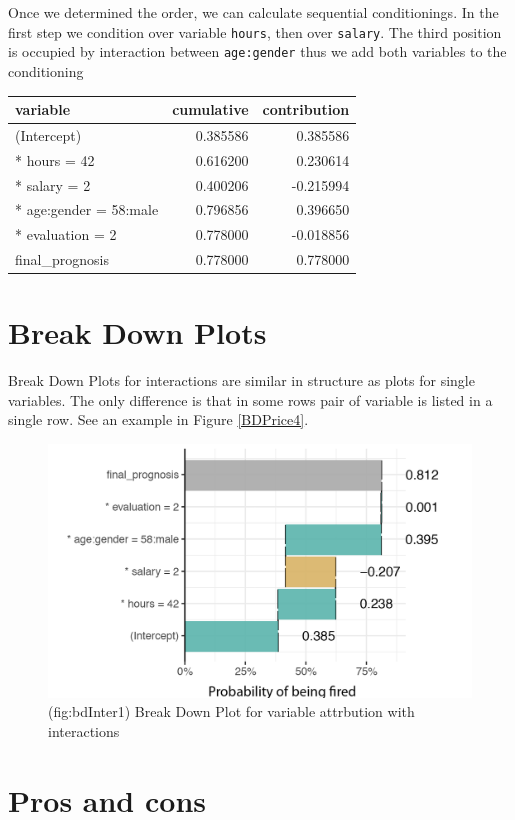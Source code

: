 \documentclass[]{book}
\theoremstyle{definition}
\theoremstyle{definition}
\theoremstyle{definition}
\theoremstyle{remark}
\begin{document}
Once we determined the order, we can calculate sequential conditionings.
In the first step we condition over variable \texttt{hours}, then over
\texttt{salary}. The third position is occupied by interaction between
\texttt{age:gender} thus we add both variables to the conditioning

\begin{longtable}[]{@{}lrr@{}}
\toprule
variable & cumulative & contribution\tabularnewline
\midrule
\endhead
(Intercept) & 0.385586 & 0.385586\tabularnewline
* hours = 42 & 0.616200 & 0.230614\tabularnewline
* salary = 2 & 0.400206 & -0.215994\tabularnewline
* age:gender = 58:male & 0.796856 & 0.396650\tabularnewline
* evaluation = 2 & 0.778000 & -0.018856\tabularnewline
final\_prognosis & 0.778000 & 0.778000\tabularnewline
\bottomrule
\end{longtable}

\hypertarget{break-down-plots-1}{%
\section{Break Down Plots}\label{break-down-plots-1}}

Break Down Plots for interactions are similar in structure as plots for
single variables. The only difference is that in some rows pair of
variable is listed in a single row. See an example in Figure
\ref{BDPrice4}.

\begin{figure}

{\centering \includegraphics[width=0.7\linewidth]{figure/bd_inter_1} 

}

\caption{(fig:bdInter1) Break Down Plot for variable attrbution with interactions }\label{fig:bdInter1}
\end{figure}

\hypertarget{pros-and-cons-1}{%
\section{Pros and cons}\label{pros-and-cons-1}}
\end{document}
